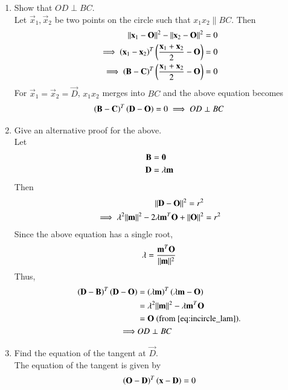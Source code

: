 \documentclass[journal,12pt,twocolumn]{IEEEtran}
\renewcommand\thesection{\arabic{section}}
\begin{document}
\begin{enumerate}[label=\thesection.\arabic*
,ref=\thesection.\theenumi]
\item Show that $OD \perp BC$.
%
\\
\solution Let $\vec{x}_1,\vec{x}_2$ be two points on the circle such that 
$x_1x_2 \parallel BC$. Then
%
\begin{align}
\lVert\mathbf{x}_1-\mathbf{O}\rVert^2- 
\lVert\mathbf{x}_2-\mathbf{O}\rVert^2 &= 0 
\\
\implies 
\left(\mathbf{x}_1-\mathbf{x}_2\right)^T\left(\frac{\mathbf{x}_1+\mathbf{x}_2}{2}-\mathbf{O}\right) &= 
0 
\\
\implies 
\left(\mathbf{B}-\mathbf{C}\right)^T\left(\frac{\mathbf{x}_1+\mathbf{x}_2}{2}-\mathbf{O}\right) &= 
0 
\end{align}
%
For $\vec{x}_1=\vec{x}_2=\vec{D}$, $x_1x_2$ merges into $BC$ and the above 
equation becomes 
%
\begin{align}
\left(\mathbf{B}-\mathbf{C}\right)^T\left(\mathbf{D}-\mathbf{O}\right) = 
0 
\implies OD \perp BC
\end{align}
%
\item Give an alternative proof for the above.
\\
\solution Let 
\begin{align}
\mathbf{B} & = \mathbf{0}
\\
\mathbf{D} &= \lambda \mathbf{m}
\end{align}
Then
\begin{align}
\lVert\mathbf{D} - \mathbf{O}\rVert^2 = r^2 &
\\
\implies \lambda^2\lVert\mathbf{m}\rVert^2 - 2\lambda\mathbf{m}^T\mathbf{O} + \lVert\mathbf{O}\rVert^2 &= r^2 
\end{align}
Since the above equation has a single root,
\begin{align}
\lambda = \frac{\mathbf{m}^T\mathbf{O}}{\lVert\mathbf{m}\rVert^2}
\label{eq:incircle_lam}
\end{align}
%
Thus, 
\begin{align}
\left(\mathbf{D} - \mathbf{B}\right)^T\left(\mathbf{D} - \mathbf{O}\right)
&= \left(\lambda\mathbf{m}\right)^T
\left(\lambda\mathbf{m}-\mathbf{O}\right)
\\
&=\lambda^2\lVert\mathbf{m}\rVert^2-\lambda\mathbf{m}^T\mathbf{O}
\\
&= \mathbf{O} \text{ (from \ref{eq:incircle_lam})}.
\\
\implies & OD \perp BC
\end{align}
\item Find the equation of the tangent at $\vec{D}$.
\\
\solution The equation of the tangent is given by 
\begin{align}
\left(\mathbf{O}-\mathbf{D}\right)^T\left(\mathbf{x}-\mathbf{D}\right)=0
\end{align}

\end{enumerate}
\end{document}
